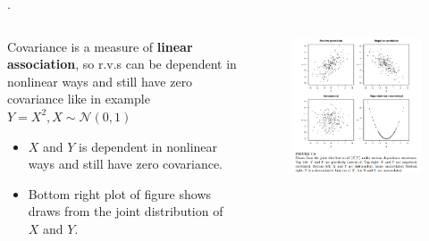 \documentclass[8pt]{beamer}
\newcommand{\mc}[1]{\mathcal{#1}}
\newcommand{\tb}[1]{\textbf{#1}}
\begin{document}
\begin{frame}{.}
    \begin{columns}
        \begin{column}{0.4\textwidth}
            Covariance is a measure of \tb{linear association}, so r.v.s can be dependent in nonlinear ways and still have zero covariance like in example $Y = X^2, X \sim \mc{N}(0,1)$
            \begin{itemize}
                \item $X$ and $Y$ is dependent in nonlinear ways and still have zero covariance.
                \item Bottom right plot of figure shows draws from the joint distribution of $X$ and $Y$.
            \end{itemize}
        \end{column}
        \begin{column}{0.6\textwidth}
            \begin{figure}
                \includegraphics[width=1.0\textwidth]{CorrelateFigures.png}
            \end{figure}
        \end{column}
    \end{columns}
\end{frame}
\end{document}
